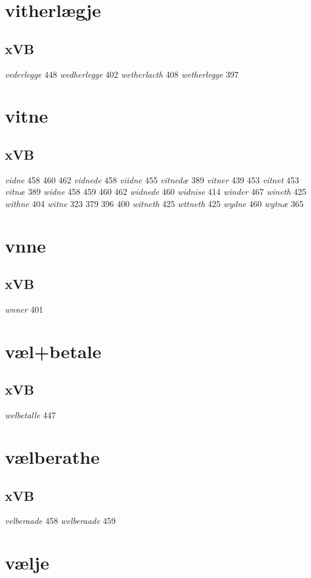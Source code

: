 \documentclass[a4paper,twocolumn]{article}
\begin{document}
\section{vitherlægje}
\label{sec:org22c7d8e}
\subsection{xVB}
\label{sec:org28c3eb5}
\emph{vederlegge} 448 \emph{wedherlegge} 402 \emph{wetherlacth} 408 \emph{wetherlegge} 397 
\section{vitne}
\label{sec:org1f6b2ce}
\subsection{xVB}
\label{sec:org6641b9d}
\emph{vidne} 458 460 462 \emph{vidnede} 458 \emph{viidne} 455 \emph{vitnedæ} 389 \emph{vitner} 439 453 \emph{vitnet} 453 \emph{vitnæ} 389 \emph{widne} 458 459 460 462 \emph{widnede} 460 \emph{widnise} 414 \emph{winder} 467 \emph{wineth} 425 \emph{withne} 404 \emph{witne} 323 379 396 400 \emph{witneth} 425 \emph{wttneth} 425 \emph{wydne} 460 \emph{wytnæ} 365 
\section{vnne}
\label{sec:org88c314d}
\subsection{xVB}
\label{sec:org6278101}
\emph{wnner} 401 
\section{væl+betale}
\label{sec:org9d6079a}
\subsection{xVB}
\label{sec:org780345a}
\emph{welbetalle} 447 
\section{vælberathe}
\label{sec:org6e815d6}
\subsection{xVB}
\label{sec:org6b0534a}
\emph{velberaade} 458 \emph{welberaade} 459 
\section{vælje}
\label{sec:org5254b0b}
\end{document}
